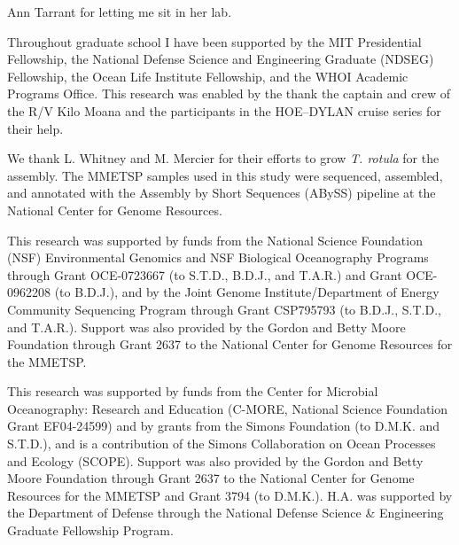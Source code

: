 {Ann Tarrant for letting me sit in her lab. 

Throughout graduate school I have been supported by the MIT Presidential Fellowship, the National Defense Science and Engineering Graduate (NDSEG) Fellowship, the Ocean Life Institute Fellowship, and the WHOI Academic Programs Office. 
This research was enabled by the thank the captain and crew of the R/V Kilo Moana and the participants in the HOE–DYLAN cruise series for their help. 

We thank L. Whitney and M. Mercier for their efforts to grow \textit{T. rotula} for the assembly. The MMETSP samples used in this study were sequenced, assembled, and annotated with the Assembly by Short Sequences (ABySS) pipeline at the National Center for Genome Resources. 

This research was supported by funds from the National Science Foundation (NSF) Environmental Genomics and NSF Biological Oceanography Programs through Grant OCE-0723667 (to S.T.D., B.D.J., and T.A.R.) and Grant OCE-0962208 (to B.D.J.), and by the Joint Genome Institute/Department of Energy Community Sequencing Program through Grant CSP795793 (to B.D.J., S.T.D., and T.A.R.). Support was also provided by the Gordon and Betty Moore Foundation through Grant 2637 to the National Center for Genome Resources for the MMETSP.


This research was supported by funds from the Center for Microbial Oceanography: Research and Education (C-MORE, National Science Foundation Grant EF04-24599) and by grants from the Simons Foundation (to D.M.K. and S.T.D.), and is a contribution of the Simons Collaboration on Ocean Processes and Ecology (SCOPE). Support was also provided by the Gordon and Betty Moore Foundation through Grant 2637 to the National Center for Genome Resources for the MMETSP and Grant 3794 (to D.M.K.). H.A. was supported by the Department of Defense through the National Defense Science \& Engineering Graduate Fellowship Program.






}
    
